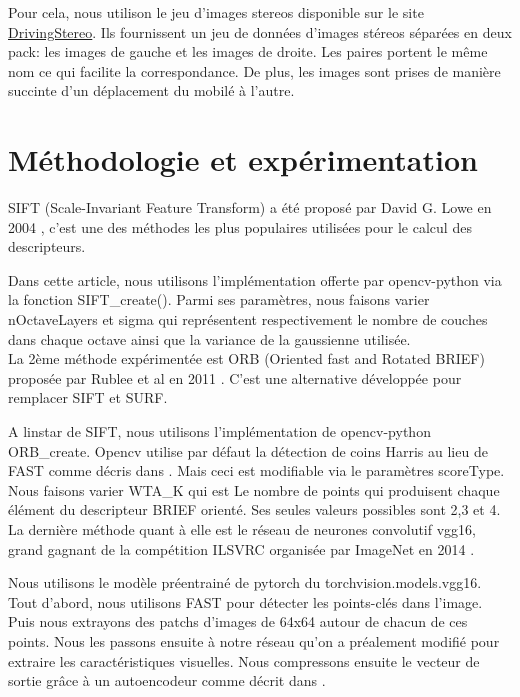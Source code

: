 \documentclass[conference]{IEEEtran}
\begin{document}
Pour cela, nous utilison le jeu d'images stereos disponible sur le site \href{https://drivingstereo-dataset.github.io/}{DrivingStereo}. Ils fournissent un jeu de données d'images stéreos séparées en deux pack: les images de gauche et les images de droite. Les paires portent le même nom ce qui facilite la correspondance. De plus, les images sont prises de manière succinte d'un déplacement du mobilé à l'autre.

\section{Méthodologie et expérimentation}\label{Method}

SIFT (Scale-Invariant Feature Transform) a été proposé par David G. Lowe en 2004 \cite{b1}, c'est une des méthodes les plus populaires utilisées pour le calcul des descripteurs. 

Dans cette article, nous utilisons l'implémentation offerte par opencv-python via la fonction SIFT\_create(). Parmi ses paramètres, nous faisons varier nOctaveLayers et sigma qui représentent respectivement le nombre de couches dans chaque octave ainsi que la variance de la gaussienne utilisée. \\

La 2ème méthode expérimentée est ORB (Oriented fast and Rotated BRIEF) proposée par Rublee et al en 2011 \cite{b2}. C'est une alternative développée pour remplacer SIFT et SURF. 

A linstar de SIFT, nous utilisons l'implémentation de opencv-python ORB\_create. Opencv utilise par défaut la détection de coins Harris au lieu de FAST comme décris dans \cite{b2}. Mais ceci est modifiable via le paramètres scoreType. Nous faisons varier WTA\_K qui est Le nombre de points qui produisent chaque élément du descripteur BRIEF orienté. Ses seules valeurs possibles sont 2,3 et 4. \\

La dernière méthode quant à elle est le réseau de neurones convolutif vgg16, grand gagnant de la compétition ILSVRC organisée par ImageNet en 2014 \cite{b3}. 

Nous utilisons le modèle préentrainé de pytorch du torchvision.models.vgg16. Tout d'abord, nous utilisons FAST pour détecter les points-clés dans l'image. Puis nous extrayons des patchs d'images de 64x64 autour de chacun de ces points. Nous les passons ensuite à notre réseau qu'on a préalement modifié pour extraire les caractéristiques visuelles. Nous compressons ensuite le vecteur de sortie grâce à un autoencodeur comme décrit dans \cite{b4}. \\
\end{document}
